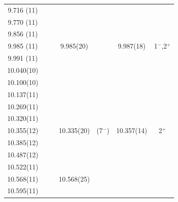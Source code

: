 \begin{center}
\begin{longtable}{cc c cc cc}
  9.716 (11)    &       &                   &                   &                   &                   &                   \\
  9.770 (11)    &       &                   &                   &                   &                   &                   \\
  9.856 (11)    &       &                   &                   &                   &                   &                   \\
  9.985 (11)    &       &                   &     9.985(20)     &                   &    9.987(18)      & 1$^-$,2$^+$       \\
  9.991 (11)    &       &                   &                   &                   &                   &                   \\
  10.040(10)    &       &                   &                   &                   &                   &                   \\
  10.100(10)    &       &                   &                   &                   &                   &                   \\
  10.137(11)    &       &                   &                   &                   &                   &                   \\
  10.269(11)    &       &                   &                   &                   &                   &                   \\
  10.320(11)    &       &                   &                   &                   &                   &                   \\
  10.355(12)    &       &                   &     10.335(20)    &   (7$^-$)         &   10.357(14)      & 2$^+$             \\
  10.385(12)    &       &                   &                   &                   &                   &                   \\
  10.487(12)    &       &                   &                   &                   &                   &                   \\
  10.522(11)    &       &                   &                   &                   &                   &                   \\
  10.568(11)    &       &                   &    10.568(25)     &                   &                   &                   \\
  10.595(11)    &       &                   &                   &                   &                   &                   \\

\end{longtable}
\end{center}
